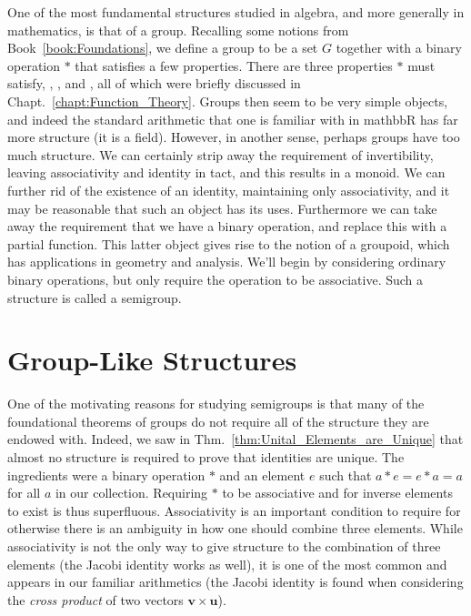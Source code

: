 One of the most fundamental structures studied in algebra, and more generally in
mathematics, is that of a \gls{group}. Recalling some notions from
Book~\ref{book:Foundations}, we define a group to be a \gls{set} $G$
together with a \gls{binary operation} $*$ that
satisfies a few properties. There are three properties $*$ must satisfy,
%
,
, and
, all of
which were briefly discussed in Chapt.~\ref{chapt:Function_Theory}. Groups then
seem to be very simple objects, and indeed the standard arithmetic that one is
familiar with in \gls{mathbbR} has far more structure (it is a
\gls{field}). However, in another sense, perhaps groups have too
much structure. We can certainly strip away the requirement of invertibility,
leaving associativity and identity in tact, and this results in a
\gls{monoid}. We can further rid of the existence of an identity,
maintaining only associativity, and it may be reasonable that such an object has
its uses. Furthermore we can take away the requirement that we have a binary
operation, and replace this with a partial function.
This latter object gives rise to the notion of a groupoid, which
has applications in geometry and analysis. We'll begin by considering ordinary
binary operations, but only require the operation to be associative. Such a
structure is called a \gls{semigroup}.
\section{Group-Like Structures}
    One of the motivating reasons for studying semigroups is that many of the
    foundational theorems of groups do not require all of the structure they are
    endowed with. Indeed, we saw in Thm.~\ref{thm:Unital_Elements_are_Unique}
    that almost no structure is required to prove that identities are unique.
    The ingredients were a binary operation $*$ and an element $e$ such that
    $a*e=e*a=a$ for all $a$ in our collection. Requiring $*$ to be associative
    and for inverse elements to exist is thus superfluous. Associativity is an
    important condition to require for otherwise there is an ambiguity in how
    one should combine three elements. While associativity is not the only way
    to give structure to the combination of three elements (the Jacobi identity
    works as well), it is one of the most common and
    appears in our familiar arithmetics (the Jacobi identity is found when
    considering the \textit{cross product} of two vectors
    $\mathbf{v}\times\mathbf{u}$).
